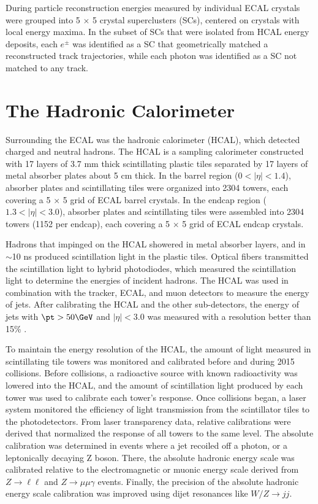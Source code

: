 During particle reconstruction energies measured by individual ECAL crystals were grouped into 5 $\times$ 5 crystal superclusters 
(SCs), centered on crystals with local energy maxima.  In the subset of SCs that were isolated 
from HCAL energy deposits, each $e^{\pm}$ was identified as a SC that geometrically matched a reconstructed track 
trajectories, while each photon was identified as a SC not matched to any track.


\section{The Hadronic Calorimeter}
\label{sec:hcalDescription}
Surrounding the ECAL was the hadronic calorimeter (HCAL), which detected charged and neutral hadrons.  The 
HCAL is a sampling calorimeter constructed with 17 layers of 3.7 mm thick scintillating plastic tiles separated by 
17 layers of metal absorber plates about 5 cm thick.  In the barrel 
region ($0 < |\eta| < 1.4$), absorber plates and scintillating tiles were organized into 2304 towers, each 
covering a 5 $\times$ 5 grid of ECAL barrel crystals.  In the endcap region ($1.3 < |\eta| < 3.0$), absorber 
plates and scintillating tiles were assembled into 2304 towers (1152 per endcap), each covering 
a 5 $\times$ 5 grid of ECAL endcap crystals.

Hadrons that impinged on the HCAL showered in metal absorber layers, and in $\sim$10 ns produced scintillation 
light in the plastic tiles.  Optical fibers transmitted the scintillation light to hybrid photodiodes, 
which measured the scintillation light to determine the energies of incident hadrons.  The HCAL was used in 
combination with the tracker, ECAL, and muon detectors to measure the energy of jets.  After calibrating the 
HCAL and the other sub-detectors, the energy of jets with $\pt > 50\GeV$ and $|\eta| < 3.0$ was measured with 
a resolution better than 15\% \cite{jetResolutionInCollisions}.

To maintain the energy resolution of the HCAL, the amount of light measured in scintillating tile towers 
was monitored and calibrated before and during 2015 collisions.  Before collisions, a radioactive source 
with known radioactivity was lowered into the HCAL, and the amount of scintillation light produced by each 
tower was used to calibrate each tower's response.  Once collisions began, a laser system 
monitored the efficiency of light transmission from the scintillator tiles to the photodetectors.  
From laser transparency data, relative calibrations were derived that normalized the response of all towers 
to the same level.  The absolute 
calibration was determined in events where a jet recoiled off a photon, or a leptonically decaying Z boson.  
There, the absolute hadronic energy 
scale was calibrated relative to the electromagnetic or muonic energy scale derived from $Z \rightarrow \ell\ell$ 
and $Z \rightarrow \mu\mu\gamma$ events.  Finally, the precision of the absolute hadronic energy scale calibration 
was improved using dijet resonances like $W/Z \rightarrow jj$.

